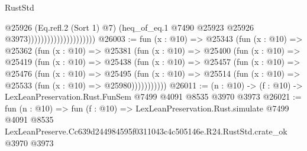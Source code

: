 \begin{lexlean}{RustStd}
\begin{coremodule}
                                            @25926
                                            (Eq.refl.{2} (Sort 1) @7)
                                            (heq_of_eq.{1}
                                              @7490
                                              @25923
                                              @25926
                                              @3973)))))))))))))))))))))
@26003 := fun (x : @10) =>
  @25343
    (fun (x : @10) =>
    @25362
      (fun (x : @10) =>
      @25381
        (fun (x : @10) =>
        @25400
          (fun (x : @10) =>
          @25419
            (fun (x : @10) =>
            @25438
              (fun (x : @10) =>
              @25457
                (fun (x : @10) =>
                @25476
                  (fun (x : @10) =>
                  @25495
                    (fun (x : @10) =>
                    @25514 (fun (x : @10) => @25533 (fun (x : @10) => @25980)))))))))))
@26011 := (n : @10) -> (f : @10) -> LexLeanPreservation.Rust.FunSem @7499 @4091 @8535 @3970 @3973
@26021 := fun (n : @10) =>
  fun (f : @10) =>
  LexLeanPreservation.Rust.simulate
    @7499
    @4091
    @8535
    LexLeanPreserve.Cc639d244984595f0311043c4c505146e.R24.RustStd.crate_ok
    @3970
    @3973
\end{coremodule}
\end{lexlean}
